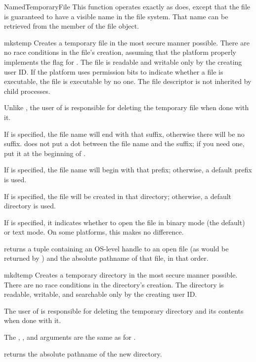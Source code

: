 \begin{funcdesc}{NamedTemporaryFile}{
				     }
This function operates exactly as  does,
except that the file is guaranteed to have a visible name in the file
system.  That name can be retrieved from the  member of
the file object.
\end{funcdesc}

\begin{funcdesc}{mkstemp}{
			  }
Creates a temporary file in the most secure manner possible.  There
are no race conditions in the file's creation, assuming that the
platform properly implements the  flag for
.  The file is readable and writable only by the
creating user ID.  If the platform uses permission bits to indicate
whether a file is executable, the file is executable by no one.  The
file descriptor is not inherited by child processes.

Unlike , the user of  is
responsible for deleting the temporary file when done with it.

If  is specified, the file name will end with that suffix,
otherwise there will be no suffix.   does not put a
dot between the file name and the suffix; if you need one, put it at
the beginning of .

If  is specified, the file name will begin with that
prefix; otherwise, a default prefix is used.

If  is specified, the file will be created in that directory;
otherwise, a default directory is used.

If  is specified, it indicates whether to open the file in
binary mode (the default) or text mode.  On some platforms, this makes
no difference.

 returns a tuple containing an OS-level handle to
an open file (as would be returned by ) and the
absolute pathname of that file, in that order.
\end{funcdesc}

\begin{funcdesc}{mkdtemp}{
			  }
Creates a temporary directory in the most secure manner possible.
There are no race conditions in the directory's creation.  The
directory is readable, writable, and searchable only by the
creating user ID.

The user of  is responsible for deleting the
temporary directory and its contents when done with it.

The , , and  arguments are the same
as for .

 returns the absolute pathname of the new directory.
\end{funcdesc}


